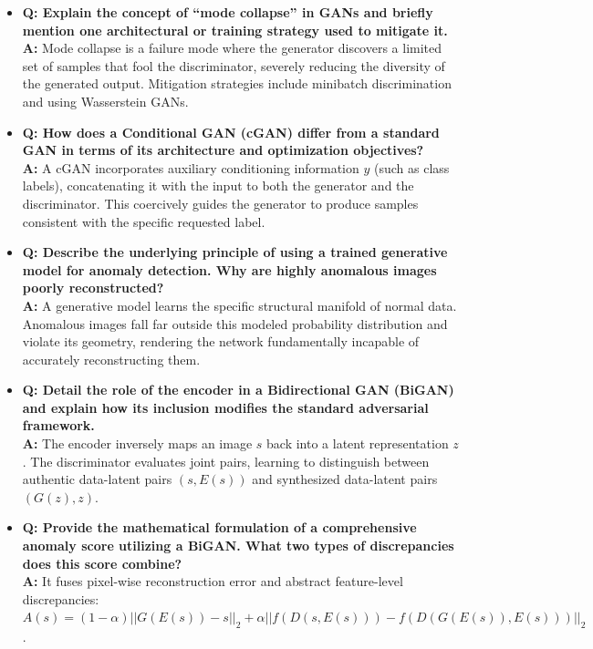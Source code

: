\begin{itemize}
    \item \textbf{Q: Explain the concept of ``mode collapse'' in GANs and briefly mention one architectural or training strategy used to mitigate it.} \\
    \textbf{A:} Mode collapse is a failure mode where the generator discovers a limited set of samples that fool the discriminator, severely reducing the diversity of the generated output. Mitigation strategies include minibatch discrimination and using Wasserstein GANs.
    
    \item \textbf{Q: How does a Conditional GAN (cGAN) differ from a standard GAN in terms of its architecture and optimization objectives?} \\
    \textbf{A:} A cGAN incorporates auxiliary conditioning information $y$ (such as class labels), concatenating it with the input to both the generator and the discriminator. This coercively guides the generator to produce samples consistent with the specific requested label.
    
    \item \textbf{Q: Describe the underlying principle of using a trained generative model for anomaly detection. Why are highly anomalous images poorly reconstructed?} \\
    \textbf{A:} A generative model learns the specific structural manifold of normal data. Anomalous images fall far outside this modeled probability distribution and violate its geometry, rendering the network fundamentally incapable of accurately reconstructing them.
    
    \item \textbf{Q: Detail the role of the encoder in a Bidirectional GAN (BiGAN) and explain how its inclusion modifies the standard adversarial framework.} \\
    \textbf{A:} The encoder inversely maps an image $s$ back into a latent representation $z$. The discriminator evaluates joint pairs, learning to distinguish between authentic data-latent pairs $(s, E(s))$ and synthesized data-latent pairs $(G(z), z)$.
    
    \item \textbf{Q: Provide the mathematical formulation of a comprehensive anomaly score utilizing a BiGAN. What two types of discrepancies does this score combine?} \\
    \textbf{A:} It fuses pixel-wise reconstruction error and abstract feature-level discrepancies: $A(s) = (1 - \alpha) ||G(E(s)) - s||_2 + \alpha ||f(D(s, E(s))) - f(D(G(E(s)), E(s)))||_2$.
\end{itemize}
